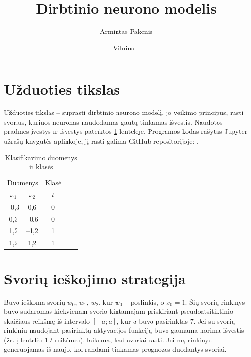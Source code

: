 \documentclass{VUMIFPSbakalaurinis}
\institute{Informatikos institutas}  %
\title{Dirbtinio neurono modelis}
\author{Armintas Pakenis}
\date{Vilnius – \the\year}
\begin{document}
\maketitle


\tableofcontents

\section{Užduoties tikslas}
Užduoties tikslas – suprasti dirbtinio neurono modelį, 
jo veikimo principus, rasti svorius, 
kuriuos neuronas naudodamas gautų tinkamas išvestis. 
Naudotos pradinės įvestys ir išvestys pateiktos \ref{tab:duomenys}
lentelėje. Programos kodas rašytas Jupyter
užrašų knygutės aplinkoje, jį rasti galima GitHub repositorijoje: 
\href{https://github.com/ArmintasP/Computational-intelligence/tree/main/Lab1}{\color{cyan}{https://github.com/ArmintasP/Computational-intelligence/tree/main/Lab1}}.

\begin{table}[H]\footnotesize
  \centering
  \caption{Klasifikavimo duomenys ir klasės}
  {\begin{tabular}{|cc|c|ll}
    \cline{1-3}
    \multicolumn{2}{|c|}{Duomenys}    & Klasė &  &  \\ \cline{1-3}
    \multicolumn{1}{|c|}{$x_1$} & $x_2$ & $t$     &  &  \\ \cline{1-3}
    \multicolumn{1}{|c|}{–0,3} & 0,6  & 0     &  &  \\ \cline{1-3}
    \multicolumn{1}{|c|}{0,3}  & –0,6 & 0     &  &  \\ \cline{1-3}
    \multicolumn{1}{|c|}{1,2}  & –1,2 & 1     &  &  \\ \cline{1-3}
    \multicolumn{1}{|c|}{1,2}  & 1,2  & 1     &  &  \\ \cline{1-3}
    \end{tabular}}
  \label{tab:duomenys}
\end{table}


\section{Svorių ieškojimo strategija}
Buvo ieškoma svorių $w_0$, $w_1$, $w_2$, kur $w_0$ – poslinkis,
o $x_0 = 1$. Šių svorių rinkinys buvo sudaromas
kiekvienam svorio kintamajam priskiriant
pseudoatsitiktinio skaičiaus reikšmę iš intervalo $[-a; a]$,
 kur $a$ buvo pasirinktas
$7$. Jei su svorių rinkiniu naudojant pasirinktą
 aktyvacijos funkciją buvo gaunama norima išvestis
 (žr. į lentelės \ref{tab:duomenys} $t$ reikšmes), laikoma,
 kad svoriai rasti. Jei ne, rinkinys generuojamas iš naujo,
 kol randami tinkamas prognozes duodantys svoriai.
\end{document}
